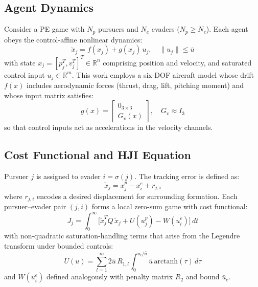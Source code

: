 \documentclass[conference]{IEEEtran}
\begin{document}
\subsection{Agent Dynamics}

Consider a PE game with $N_p$ pursuers and $N_e$ evaders ($N_p \geq N_e$). Each agent obeys the control-affine nonlinear dynamics:
\begin{equation}\label{eq:dynamics}
\dot{x}_j = f(x_j) + g(x_j)\,u_j, \quad \|u_j\| \leq \bar{u}
\end{equation}
with state $x_j = [p_j^T, v_j^T]^T \in \mathbb{R}^n$ comprising position and velocity, and saturated control input $u_j \in \mathbb{R}^m$. This work employs a six-DOF aircraft model whose drift $f(x)$ includes aerodynamic forces (thrust, drag, lift, pitching moment) and whose input matrix satisfies:
\begin{equation}\label{eq:g_struct}
g(x) = \begin{bmatrix} 0_{3\times 3} \\ G_v(x) \end{bmatrix}, \quad G_v \approx I_3
\end{equation}
so that control inputs act as accelerations in the velocity channels.

\subsection{Cost Functional and HJI Equation}

Pursuer $j$ is assigned to evader $i = \sigma(j)$. The tracking error is defined as:
\begin{equation}\label{eq:error}
\tilde{x}_j = x_j^p - x_i^e + r_{j,i}
\end{equation}
where $r_{j,i}$ encodes a desired displacement for surrounding formation. Each pursuer--evader pair $(j, i)$ forms a local zero-sum game with cost functional:
\begin{equation}\label{eq:cost}
J_j = \int_0^\infty \!\Big[\tilde{x}_j^T Q\,\tilde{x}_j + U(u_j^p) - W(u_i^e)\Big]\,dt
\end{equation}
with non-quadratic saturation-handling terms that arise from the Legendre transform under bounded controls:
\begin{equation}\label{eq:nq}
U(u) = \sum_{l=1}^m 2\bar{u}\,R_{1,l}\int_0^{u_l/\bar{u}} \bar{u}\,\mathrm{arctanh}(\tau)\,d\tau
\end{equation}
and $W(u_i^e)$ defined analogously with penalty matrix $R_2$ and bound $\bar{u}_e$.
\end{document}
